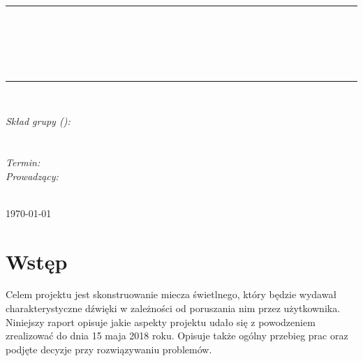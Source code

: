 \documentclass[10pt, a4paper]{article}
\begin{document}
\def\tablename{Tabela}	%

\begin{titlepage}
	\begin{center}
		\textsc{\LARGE \formakursu}\\[1cm]		
		\textsc{\Large \kurs}\\[0.5cm]		
		\rule{\textwidth}{0.08cm}\\[0.4cm]
		{\huge \bfseries \doctype}\\[1cm]
		{\huge \bfseries \projectname}\\[0.5cm]
		{\huge \bfseries \acronim}\\[0.4cm]
		\rule{\textwidth}{0.08cm}\\[1cm]
		
		\begin{flushright} \large
		\emph{Skład grupy (\nrgrupy):}\\
		\osobaA\\
		\osobaB\\[0.4cm]
		
		\emph{Termin: }\termin\\[0.4cm]

		\emph{Prowadzący:} \\
		\prowadzacy \\
		
		\end{flushright}
		
		\vfill
		
		{\large \today}
	\end{center}	
\end{titlepage}

\newpage
\tableofcontents
\newpage

\section{Wstęp}
\label{sec:Wstęp}
Celem projektu jest skonstruowanie miecza świetlnego, który będzie wydawał charakterystyczne dźwięki w zależności od poruszania nim przez użytkownika. 
Niniejszy raport opisuje jakie aspekty projektu udało się z powodzeniem zrealizować do dnia 15 maja 2018 roku. Opisuje także ogólny przebieg prac oraz podjęte decyzje przy rozwiązywaniu problemów. 
\end{document}
